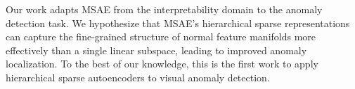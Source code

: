 Our work adapts MSAE from the interpretability domain to the anomaly detection task.
We hypothesize that MSAE's hierarchical sparse representations can capture the fine-grained structure of normal feature manifolds more effectively than a single linear subspace, leading to improved anomaly localization.
To the best of our knowledge, this is the first work to apply hierarchical sparse autoencoders to visual anomaly detection.

